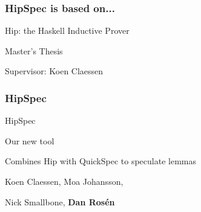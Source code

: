 \documentclass[serif,professionalfont]{beamer}
\begin{document}
\newcommand{\defBNF}[4] {\text{#1}\quad&#2&::=&\;#3&\text{#4}}
\newcommand{\defaltBNF}[2] {&&|&\;#1&\text{#2}}

\newcommand{\hstup}[2]{\hs{(} #1 \hs{,} #2 \hs{)}}

\newcommand{\nsqsubseteq}{\,\,\, /\!\!\!\!\!\!\sqsubseteq}

\newcommand{\bindname}{>\!\!>\!\!=}
\newcommand{\bind}[2]{#1 \bindname #2}
\newcommand{\bindp}[3]{\fn{bind'}(#1,#2,#3)}
\newcommand{\fork}[2]{\fn{fork}(#1,#2)}
\newcommand{\forkr}[1]{\fn{right}(#1)}
\newcommand{\forkl}[1]{\fn{left}(#1)}
\newcommand{\leaf}[1]{\fn{leaf}(#1)}
\newcommand{\unleaf}[1]{\fn{unleaf}(#1)}
\newcommand{\return}[1]{\fn{return}(#1)}

\newcommand{\bindb}[2]{#1 \tofix{\bindname} #2}
\newcommand{\bindw}[2]{#1 \unfix{\bindname} #2}


\newcommand\Inf{\fn{Inf}}
\newcommand\Total{\fn{Total}}
\newcommand\Fin{\fn{Fin}}

\begin{frame}
  \frametitle{HipSpec is based on...}

  \begin{center}
  {\Large Hip: the Haskell Inductive Prover}

  \vspace{2\baselineskip}

  Master's Thesis

  \vspace{2\baselineskip}

  Supervisor: Koen Claessen

  \end{center}
\end{frame}

\begin{frame}
  \frametitle{HipSpec}

  \begin{center}
  {\Large HipSpec}

  \vspace{2\baselineskip}

  Our new tool

  Combines Hip with QuickSpec to speculate lemmas

  \vspace{2\baselineskip}

  Koen Claessen, Moa Johansson,

  Nick Smallbone, \textbf{Dan Ros\'en}

  \end{center}
\end{frame}
\end{document}
